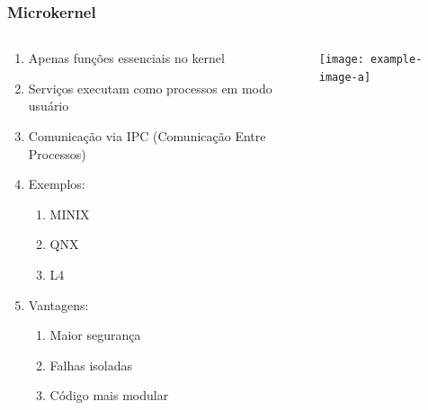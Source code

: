 \documentclass{beamer}
\begin{document}
\begin{frame}[fragile]
\frametitle{Microkernel}

\begin{columns}
    \begin{column}{0.55\textwidth}
        \begin{enumerate}\small
            \item Apenas funções essenciais no kernel
            \item Serviços executam como processos em modo usuário
            \item Comunicação via IPC (Comunicação Entre Processos)
            \item Exemplos:
            \begin{enumerate}\footnotesize
                \item MINIX
                \item QNX
                \item L4
            \end{enumerate}
            \item Vantagens:
            \begin{enumerate}\footnotesize
                \item Maior segurança
                \item Falhas isoladas
                \item Código mais modular
            \end{enumerate}
        \end{enumerate}
    \end{column}
    
    \begin{column}{0.45\textwidth}
        \begin{center}
            \texttt{[image: example-image-a]}
        \end{center}
    \end{column}
\end{columns}
\end{frame}
\end{document}
